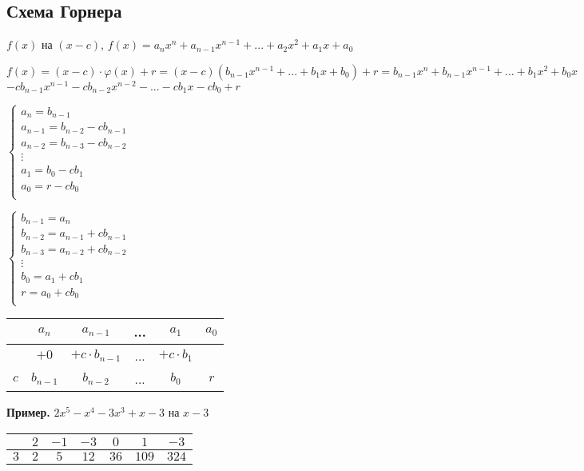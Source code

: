 \documentclass{article}
\begin{document}
    \subsection{Схема Горнера}
    
    \(f(x)\) на \((x-c)\), \(f(x) = a_nx^n+a_{n-1}x^{n-1}+...+a_2x^2+a_1x+a_0\)

    \(f(x) = (x-c)\cdot \varphi(x) + r = (x-c)(b_{n-1}x^{n-1}+...+b_1x+b_0) + r = b_{n-1}x^n+b_{n-1}x^{n-1}+...+b_1x^2+b_0x\)
    \(- cb_{n-1}x^{n-1} - cb_{n-2}x^{n-2} - ... - cb_1 x - cb_0 + r\)

    \(\begin{cases}
        a_n = b_{n-1}\\
        a_{n-1} = b_{n-2} - cb_{n-1}\\
        a_{n-2} = b_{n-3} - cb_{n-2}\\
        \vdots\\
        a_{1} = b_{0} - cb_{1}\\
        a_{0} = r - cb_{0}\\
    \end{cases}\)
    
    
    \(\begin{cases}
        b_{n-1} = a_n\\
        b_{n-2} = a_{n-1} + cb_{n-1}\\
        b_{n-3} = a_{n-2} + cb_{n-2}\\
        \vdots\\
        b_{0} = a_{1} + cb_{1}\\
        r = a_{0} + cb_{0}\\
    \end{cases}\)
    
    \begin{tabular}{c | c | c | c | c | c |}
        & \(a_n\) & \(a_{n-1}\) & ... & \(a_1\) & \(a_0\)\\
        \hline
        & \(+0\) &\(+c\cdot b_{n-1}\) & ... & \(+c\cdot b_1\) & \\
        \hline
        \(c\) & \(b_{n-1}\) &\(b_{n-2}\) & ... & \(b_0\) & \(r\)\\
    \end{tabular}


    \textbf{Пример.}
    \(2x^5 - x^4 - 3x^3 + x - 3 \) на \(x - 3\)

    \begin{tabular}{c | c | c | c | c | c | c |}
        & \(2\) & \(-1\) & \(-3\) & \(0\) & \(1\) & \(-3\)\\
        \hline
        \(3\) & \(2\) &\(5\) & \(12\) & \(36\) & \(109\) & \(324\)\\
    \end{tabular}
\end{document}
